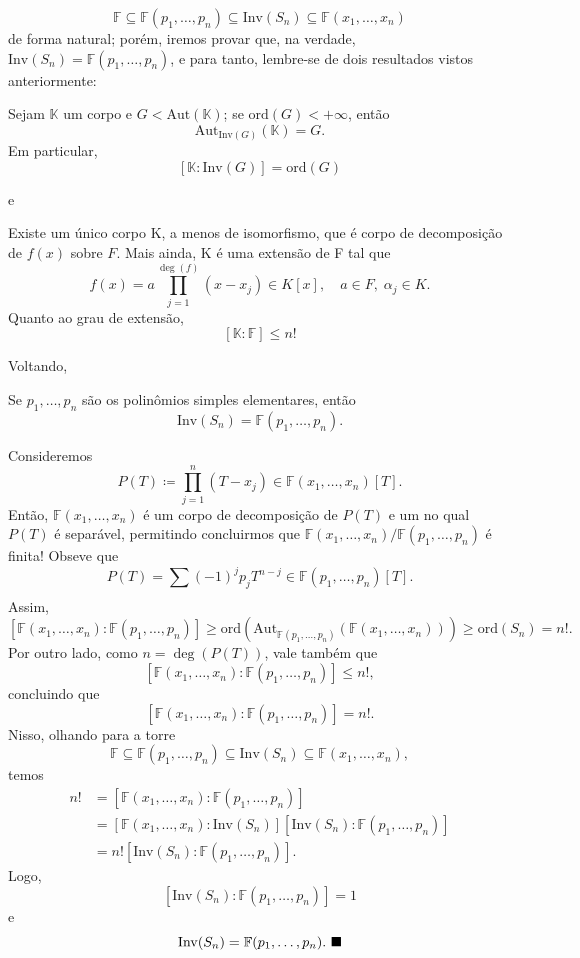 \documentclass[../algebraIII_notes.tex]{subfiles}
\begin{document}
\[
	\mathbb{F}\subseteq \mathbb{F}(p_1, \dotsc , p_{n}) \subseteq \mathrm{Inv}(S_{n})\subseteq \mathbb{F}(x_1, \dotsc , x_{n})
\]
de forma natural; porém, iremos provar que, na verdade, \(\mathrm{Inv}(S_{n}) = \mathbb{F}(p_1, \dotsc , p_{n})\), e para tanto, lembre-se de dois resultados vistos anteriormente:
\begin{theorem*}
	Sejam \(\mathbb{K}\) um corpo e \(G<\mathrm{Aut}(\mathbb{K})\); se \(\mathrm{ord}(G)<+\infty\), então
	\[
		\mathrm{Aut}_{\mathrm{Inv}(G)}(\mathbb{K})=G.
	\]
	Em particular,
	\[
		[\mathbb{K}: \mathrm{Inv}(G)] = \mathrm{ord}(G)
	\]
\end{theorem*}
e
\begin{theorem*}
	Existe um único corpo K, a menos de isomorfismo, que é corpo de decomposição de \(f(x)\) sobre \(F\). Mais ainda, K é uma extensão de F tal que
	\[
		f(x) = a \prod\limits_{j=1}^{\deg{(f)}}(x-x_{j})\in K[x], \quad a\in F,\; \alpha_{j}\in K.
	\]
	Quanto ao grau de extensão,
	\[
		[\mathbb{K}:\mathbb{F}] \leq n!
	\]
\end{theorem*}
Voltando,
\begin{theorem*}
	Se \(p_1, \dotsc , p_{n}\) são os polinômios simples elementares, então
	\[
		\mathrm{Inv}(S_{n}) = \mathbb{F}(p_1, \dotsc , p_{n}).
	\]
\end{theorem*}
\begin{proof*}
	Consideremos
	\[
		P(T)\coloneqq \prod\limits_{j=1}^{n}(T-x_{j})\in \mathbb{F}(x_1, \dotsc , x_{n})[T].
	\]
	Então, \(\mathbb{F}(x_1, \dotsc , x_{n})\) é um corpo de decomposição de \(P(T)\) e um no qual \(P(T)\) é separável, permitindo concluirmos que \(\mathbb{F}(x_1, \dotsc , x_{n})/\mathbb{F}(p_1, \dotsc , p_{n})\) é finita! Obseve que
	\[
		P(T) = \sum\limits_{}^{}(-1)^{j}p_{j}T^{n-j}\in \mathbb{F}(p_1, \dotsc , p_{n})[T].
	\]
	Assim,
	\[
		[\mathbb{F}(x_1, \dotsc , x_{n}):\mathbb{F}(p_1, \dotsc , p_{n})]\geq \mathrm{ord}(\mathrm{Aut}_{\mathbb{F}(p_1, \dotsc , p_{n})}(\mathbb{F}(x_1, \dotsc , x_{n}))) \geq \mathrm{ord}(S_{n}) = n!.
	\]
	Por outro lado, como \(n=\deg{(P(T))}\), vale também que
	\[
		[\mathbb{F}(x_1, \dotsc , x_{n}):\mathbb{F}(p_1, \dotsc , p_{n})]\leq n!,
	\]
	concluindo que
	\[
		[\mathbb{F}(x_1, \dotsc , x_{n}):\mathbb{F}(p_1, \dotsc , p_{n})]=n!.
	\]
	Nisso, olhando para a torre
	\[
		\mathbb{F}\subseteq \mathbb{F}(p_1, \dotsc , p_{n})\subseteq \mathrm{Inv}(S_{n})\subseteq \mathbb{F}(x_1, \dotsc , x_{n}),
	\]
	temos
	\begin{align*}
		n! & = [\mathbb{F}(x_1, \dotsc , x_{n}):\mathbb{F}(p_1, \dotsc , p_{n})]                                          \\
		   & = [\mathbb{F}(x_1, \dotsc , x_{n}):\mathrm{Inv}(S_{n})][\mathrm{Inv}(S_{n}):\mathbb{F}(p_1, \dotsc , p_{n})] \\
		   & = n![\mathrm{Inv}(S_{n}):\mathbb{F}(p_1, \dotsc , p_{n})].
	\end{align*}
	Logo,
	\[
		[\mathrm{Inv}(S_{n}):\mathbb{F}(p_1, \dotsc , p_{n})]=1
	\]
	e
	\[
		\mathrm{Inv}(S_{n}) = \mathbb{F}(p_1, \dotsc , p_{n}). \text{ $\blacksquare$}
	\]

\end{proof*}
\end{document}
